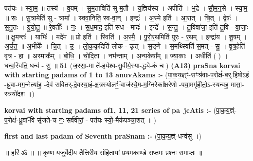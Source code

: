 \documentclass[17pt]{extarticle}
\begin{document}
                  पत॑यः । स्या॒म॒ ॥ तस्य॑ । व॒यम् । सु॒म॒ताविति॑ सु-म॒तौ । य॒ज्ञिय॑स्य । अपीति॑ । भ॒द्रे । सौ॒म॒न॒से । स्या॒म॒ ॥ सः । सु॒त्रामेति॑ सु - त्रामा᳚ । स्ववा॒निति॒ स्व-वा॒न् । इन्द्रः॑ । अ॒स्मे इति॑ । आ॒रात् । चि॒त् । द्वेषः॑ । स॒नु॒तः । यु॒यो॒तु॒ ॥ रे॒वतीः᳚ । नः॒ । स॒ध॒माद॒ इति॑ सध - मादः॑ । इन्द्रे᳚ । स॒न्तु॒ । तु॒विवा॑जा॒ इति॑ तु॒वि - वा॒जाः॒ ॥ क्षु॒मन्तः॑ । याभिः॑ । मदे॑म ॥ प्रो इति॑ । स्विति॑ । अ॒स्मै॒ । पु॒रो॒र॒थमिति॑ पुरः - र॒थम् । इन्द्रा॑य । शू॒षम् । अ॒र्च॒त॒ ॥ अ॒भीके᳚ । चि॒त् । उ॒ । लो॒क॒कृदिति॑ लोक - कृत् । स॒ङ्गे । स॒मथ्स्विति॑ स॒मत् - सु॒ । वृ॒त्र॒हेति॑ वृत्र - हा ॥ अ॒स्माक᳚म् । बो॒धि॒ । चो॒दि॒ता । नभ॑न्ताम् । अ॒न्य॒केषा᳚म् ॥ ज्या॒काः । अधीति॑ ( ) । धन्व॒स्विति॒ धन्व॑ - सु॒ ॥ \textbf{  51} \newline
                  \newline
                      (ज॒रसा॒-मा ते॑-हर्यश्व-सु॒वीर्य॒स्या-द्ध्ये-कं॑ च )  \textbf{(A13)} \newline \newline
\textbf{praSna korvai with starting padams of 1 to 13 anuvAkams :-} \newline
(पा॒क॒य॒ज्ञ्ꣳ-सꣳश्र॑वाः-प॒रोक्षं॑-ब॒र्॒.हिषो॒ऽहं -ध्रु॒वा-मग॒न्मेत्या॑ह॒ -देव॑ सवितर्-दे॒वस्या॒हं-क्ष॒त्रस्योलꣳं॒-ॅवाज॑स्ये॒म-म॒ग्निरेका᳚क्षरेणो -पया॒मगृ॑हीतो॒ऽ-स्यन्वह॒ मासा॒-स्त्रयो॑दश ।) \newline

\textbf{korvai with starting padams of1, 11, 21 series of pa~jcAtis :-} \newline
(पा॒क॒य॒ज्ञ्ं-प॒रोक्षं॑-ध्रु॒वां-ॅवि सृ॑जते-च नः॒ सर्व॑वीरां॒ - पत॑यः स्यो॒-मैक॑पञ्चा॒शत् । ) \newline

\textbf{first and last padam of Seventh praSnam :-} \newline
(पा॒क॒य॒ज्ञ्ं-धन्व॑सु ।) \newline 


॥ हरि॑ ॐ ॥
॥ कृष्ण यजुर्वेदीय तैत्तिरीय संहितायां प्रथमकाण्डे सप्तमः प्रश्नः समाप्तः ॥ \newline
\pagebreak
\pagebreak
        
\end{document}
